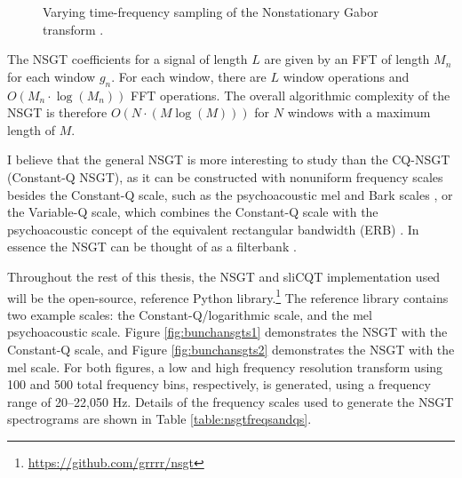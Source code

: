 \documentclass[report.tex]{subfiles}
\begin{document}
\begin{figure}[ht]
	\centering
	\hspace{1em}
	\caption{Varying time-frequency sampling of the Nonstationary Gabor transform \parencite[1485, 1487]{balazs}.}
	\label{fig:nonuniformtflattices}
\end{figure}

The NSGT coefficients for a signal of length $L$ are given by an FFT of length $M_{n}$ for each window $g_{n}$. For each window, there are $L$ window operations and $O(M_{n} \cdot \log(M_{n}))$ FFT operations. The overall algorithmic complexity of the NSGT is therefore $O(N \cdot (M \log(M)))$ for $N$ windows with a maximum length of $M$.

I believe that the general NSGT is more interesting to study than the CQ-NSGT (Constant-Q NSGT), as it can be constructed with nonuniform frequency scales besides the Constant-Q scale, such as the psychoacoustic mel and Bark scales \parencite{melbook}, or the Variable-Q scale, which combines the Constant-Q scale with the psychoacoustic concept of the equivalent rectangular bandwidth (ERB) \parencite{variableq1, variableq2}. In essence the NSGT can be thought of as a filterbank \parencite{variableq1}.

Throughout the rest of this thesis, the NSGT and sliCQT implementation used will be the open-source, reference Python library.\footnote{\url{https://github.com/grrrr/nsgt}} The reference library contains two example scales: the Constant-Q/logarithmic scale, and the mel psychoacoustic scale. Figure \ref{fig:bunchansgts1} demonstrates the NSGT with the Constant-Q scale, and Figure \ref{fig:bunchansgts2} demonstrates the NSGT with the mel scale. For both figures, a low and high frequency resolution transform using 100 and 500 total frequency bins, respectively, is generated, using a frequency range of 20--22,050 Hz. Details of the frequency scales used to generate the NSGT spectrograms are shown in Table \ref{table:nsgtfreqsandqs}.
\end{document}
